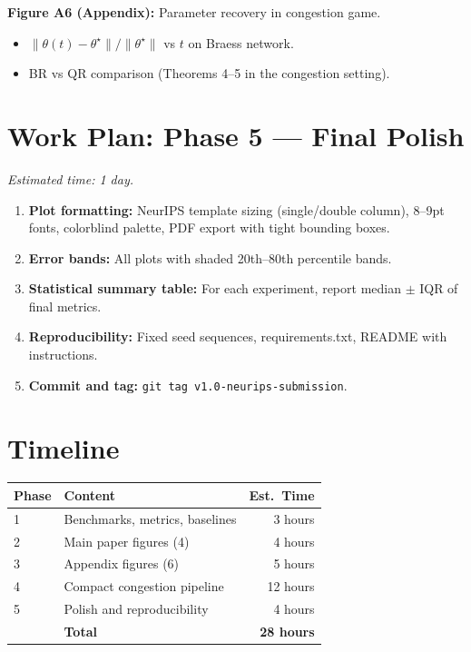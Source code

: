 \documentclass[11pt]{article}
\begin{document}
\textbf{Figure A6 (Appendix):} Parameter recovery in congestion game.
\begin{itemize}[nosep]
    \item $\|\theta(t) - \theta^\star\| / \|\theta^\star\|$ vs $t$ on Braess network.
    \item BR vs QR comparison (Theorems 4--5 in the congestion setting).
\end{itemize}

\section{Work Plan: Phase 5 --- Final Polish}

\textit{Estimated time: 1 day.}

\begin{enumerate}[nosep]
    \item \textbf{Plot formatting:} NeurIPS template sizing (single/double column), 8--9pt fonts, colorblind palette, PDF export with tight bounding boxes.
    \item \textbf{Error bands:} All plots with shaded 20th--80th percentile bands.
    \item \textbf{Statistical summary table:} For each experiment, report median $\pm$ IQR of final metrics.
    \item \textbf{Reproducibility:} Fixed seed sequences, requirements.txt, README with instructions.
    \item \textbf{Commit and tag:} \texttt{git tag v1.0-neurips-submission}.
\end{enumerate}

\section{Timeline}

\begin{table}[h]
\centering
\begin{tabular}{llr}
\toprule
\textbf{Phase} & \textbf{Content} & \textbf{Est.\ Time} \\
\midrule
1 & Benchmarks, metrics, baselines & 3 hours \\
2 & Main paper figures (4) & 4 hours \\
3 & Appendix figures (6) & 5 hours \\
4 & Compact congestion pipeline & 12 hours \\
5 & Polish and reproducibility & 4 hours \\
\midrule
& \textbf{Total} & \textbf{28 hours} \\
\bottomrule
\end{tabular}
\end{table}
\end{document}
